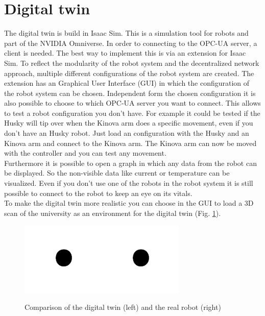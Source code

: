 \documentclass[conference]{IEEEtran}
\begin{document}
\section{Digital twin}
The digital twin is build in Isaac Sim.
This is a simulation tool for robots and part of the NVIDIA Omniverse.
In order to connecting to the OPC-UA server, a client is needed.
The best way to implement this is via an extension for Isaac Sim.
To reflect the modularity of the robot system and the decentralized network approach, multiple different configurations of the robot system are created.
The extension has an Graphical User Interface (GUI) in which the configuration of the robot system can be chosen.
Independent form the chosen configuration it is also possible to choose to which OPC-UA server you want to connect.
This allows to test a robot configuration you don't have. 
For example it could be tested if the Husky will tip over when the Kinova arm does a specific movement, even if you don't have an Husky robot.
Just load an configuration with the Husky and an Kinova arm and connect to the Kinova arm.
The Kinova arm can now be moved with the controller and you can test any movement.\\
Furthermore it is possible to open a graph in which any data from the robot can be displayed.
So the non-visible data like current or temperature can be visualized.
Even if you don't use one of the robots in the robot system it is still possible to connect to the robot to keep an eye on its vitals.\\
To make the digital twin more realistic you can choose in the GUI to load a 3D scan of the university as an environment for the digital twin (Fig. \ref{fig:CompareDigitalReal}).
\begin{figure}[htbp]
    \centerline{\includegraphics[width=4cm]{Pictures/fig1.png}\includegraphics[width=4cm]{Pictures/fig1.png}}
    \caption{Comparison of the digital twin (left) and the real robot (right)}
    \label{fig:CompareDigitalReal}
\end{figure}
\end{document}
